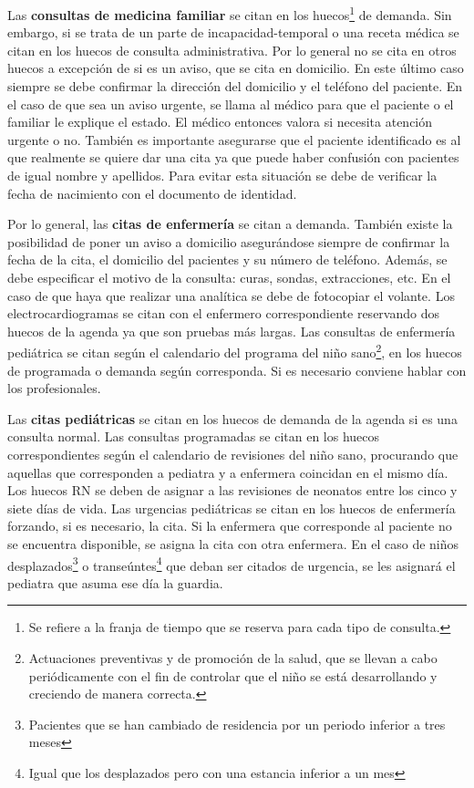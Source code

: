 Las \textbf{consultas de medicina familiar} se citan en los huecos\footnote{Se refiere a la franja de tiempo que se reserva para cada tipo de consulta.} de demanda.
Sin embargo, si se trata de un parte de \gls{incapacidad-temporal} o una receta médica se citan en los huecos de consulta administrativa.
Por lo general no se cita en otros huecos a excepción de si es un aviso, que se cita en domicilio.
En este último caso siempre se debe confirmar la dirección del domicilio y el teléfono del paciente.
En el caso de que sea un aviso urgente, se llama al médico para que el paciente o el familiar le explique el estado.
El médico entonces valora si necesita atención urgente o no.
También es importante asegurarse que el paciente identificado es al que realmente se quiere dar una cita ya que puede haber confusión con pacientes de igual nombre y apellidos.
Para evitar esta situación se debe de verificar la fecha de nacimiento con el documento de identidad.

Por lo general, las \textbf{citas de enfermería} se citan a demanda.
También existe la posibilidad de poner un aviso a domicilio asegurándose siempre de confirmar la fecha de la cita, el domicilio del pacientes y su número de teléfono.
Además, se debe especificar el motivo de la consulta: curas, sondas, extracciones, etc.
En el caso de que haya que realizar una analítica se debe de fotocopiar el \gls{volante}.
Los \glspl{electrocardiograma} se citan con el enfermero correspondiente reservando dos huecos de la agenda ya que son pruebas más largas.
Las consultas de enfermería pediátrica se citan según el calendario del programa del niño sano\footnote{Actuaciones preventivas y de promoción de la salud, que se llevan a cabo periódicamente con el fin de controlar que el niño se está desarrollando y creciendo de manera correcta.}, en los huecos de programada o demanda según corresponda. Si es necesario conviene hablar con los profesionales.

Las \textbf{citas pediátricas} se citan en los huecos de demanda de la agenda si es una consulta normal.
Las consultas programadas se citan en los huecos correspondientes según el calendario de revisiones del niño sano, procurando que aquellas que corresponden a pediatra y a enfermera coincidan en el mismo día.
Los huecos RN se deben de asignar a las revisiones de neonatos entre los cinco y siete días de vida.
Las urgencias pediátricas se citan en los huecos de enfermería forzando, si es necesario, la cita.
Si la enfermera que corresponde al paciente no se encuentra disponible, se asigna la cita con otra enfermera.
En el caso de niños desplazados\footnote{Pacientes que se han cambiado de residencia por un periodo inferior a tres meses} o transeúntes\footnote{Igual que los desplazados pero con una estancia inferior a un mes} que deban ser citados de urgencia, se les asignará el pediatra que asuma ese día la \gls{guardia}.

